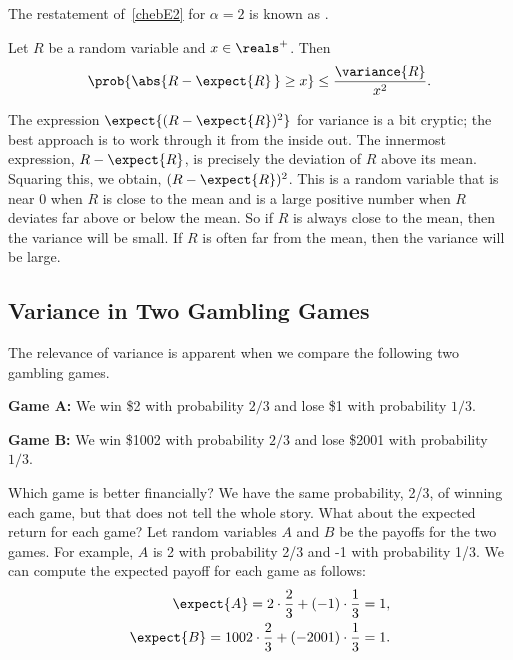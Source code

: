 The restatement of~\eqref{chebE2} for $\alpha=2$ is known as
.
\begin{theorem}[Chebyshev]\label{chebthm}
  Let $R$ be a random variable and $x \in \reals^+$.  Then
\[
\prob{\abs{R - \expect{R}\, } \geq x} \leq \frac{\variance{R}}{x^2}.
\]
\end{theorem}

The expression $\expect{(R - \expect{R})^2}$ for variance is a bit
cryptic; the best approach is to work through it from the inside out.  The
innermost expression, $R - \expect{R}$, is precisely the deviation of $R$
above its mean.  Squaring this, we obtain, $(R - \expect{R})^2$.  This is
a random variable that is near 0 when $R$ is close to the mean and is a
large positive number when $R$ deviates far above or below the mean.  So
if $R$ is always close to the mean, then the variance will be small.  If
$R$ is often far from the mean, then the variance will be large.

\subsection{Variance in Two Gambling Games}

The relevance of variance is apparent when we compare the following
two gambling games.

\textbf{Game A:} We win \$2 with probability $2/3$ and lose \$1 with probability
$1/3$.

\textbf{Game B:} We win \$1002 with probability $2/3$ and lose \$2001 with
probability $1/3$.

Which game is better financially?  We have the same probability, 2/3,
of winning each game, but that does not tell the whole story.  What about
the expected return for each game?  Let random variables $A$ and $B$ be
the payoffs for the two games.  For example, $A$ is 2 with probability
2/3 and -1 with probability 1/3.  We can compute the
expected payoff for each game as follows:
\begin{eqnarray*}
\expect{A} = 2 \cdot \frac{2}{3} + (-1) \cdot \frac{1}{3} = 1, \\
\expect{B} = 1002 \cdot \frac{2}{3} + (-2001) \cdot \frac{1}{3} = 1.
\end{eqnarray*}

